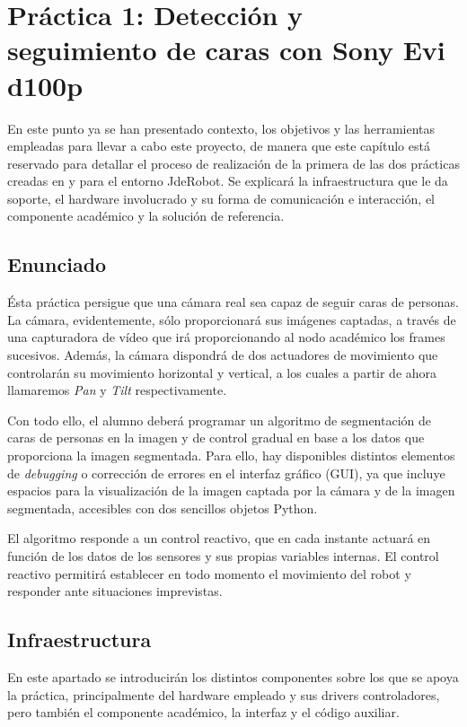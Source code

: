 \chapter{Práctica 1: Detección y seguimiento de caras con Sony Evi d100p}\label{cap.followface}
En este punto ya se han presentado contexto, los objetivos y las herramientas empleadas para llevar a cabo este proyecto, de manera que este capítulo está reservado para detallar el proceso de realización de la primera de las dos prácticas creadas en y para el entorno JdeRobot. Se explicará la infraestructura que le da soporte, el hardware involucrado y su forma de comunicación e interacción, el componente académico y la solución de referencia.

\section{Enunciado} \label{sec.enunciado}
Ésta práctica persigue que una cámara real sea capaz de seguir caras de personas. La cámara, evidentemente, sólo proporcionará sus imágenes captadas, a través de una capturadora de vídeo que irá proporcionando al nodo académico los frames  sucesivos. Además, la cámara dispondrá de dos actuadores de movimiento que controlarán su movimiento horizontal y vertical, a los cuales a partir de ahora llamaremos \textit{Pan} y \textit{Tilt} respectivamente.

Con todo ello, el alumno deberá programar un algoritmo de segmentación de caras de personas en la imagen y de control gradual en base a los datos que proporciona la imagen segmentada. Para ello, hay disponibles distintos elementos de \textit{debugging} o corrección de errores en el interfaz gráfico (GUI), ya que incluye espacios para la visualización de la imagen captada por la cámara y de la imagen segmentada, accesibles con dos sencillos objetos Python.

El algoritmo responde a un control reactivo, que en cada instante actuará en función de los datos de los sensores y sus propias variables internas. El control reactivo permitirá establecer en todo momento el movimiento del robot y responder ante situaciones imprevistas.

\section{Infraestructura}
En este apartado se introducirán los distintos componentes sobre los que se apoya la práctica, principalmente del hardware empleado y sus drivers controladores, pero también el componente académico, la interfaz y el código auxiliar.

